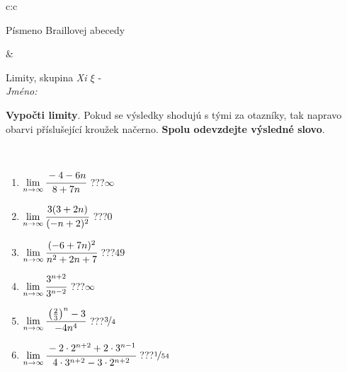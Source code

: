 \documentclass[10pt]{report}
\begin{document}
\begin{tabular}{c:c}
\begin{minipage}[c][104.5mm][t]{0.5\linewidth}
\begin{center}
\begin{minipage}{0.20\linewidth}
\begin{center}
{\small Písmeno Braillovej abecedy}
\end{center}
\end{minipage}
\end{center}
\end{minipage}
&
\begin{minipage}[c][104.5mm][t]{0.5\linewidth}
\begin{center}
\vspace{7mm}
{\huge Limity, skupina \textit{Xi $\xi$} -}\\[5mm]
\textit{Jméno:}\phantom{xxxxxxxxxxxxxxxxxxxxxxxxxxxxxxxxxxxxxxxxxxxxxxxxxxxxxxxxxxxxxxxxx}\\[5mm]
\begin{minipage}{0.95\linewidth}
\begin{center}
\textbf{Vypočti limity}. Pokud se výsledky shodujú s tými za otazníky, tak napravo\\obarvi příslušející kroužek načerno. \textbf{Spolu odevzdejte výsledné slovo}.
\end{center}
\end{minipage}
\\[1mm]
\begin{minipage}{0.79\linewidth}
\begin{center}
\begin{varwidth}{\linewidth}
\begin{enumerate}
\normalsize
\item $\lim\limits_{n\to\infty}\cfrac{-4-6n}{8+7n}$\quad \dotfill\; ???\;\dotfill \quad $\infty$
\item $\lim\limits_{n\to\infty}\cfrac{3(3+2n)}{(-n+2)^2}$\quad \dotfill\; ???\;\dotfill \quad $0$
\item $\lim\limits_{n\to\infty}\cfrac{(-6+7n)^2}{n^2+2n+7}$\quad \dotfill\; ???\;\dotfill \quad $49$
\item $\lim\limits_{n\to\infty}\cfrac{3^{n+2}}{3^{n-2}}$\quad \dotfill\; ???\;\dotfill \quad $\infty$
\item $\lim\limits_{n\to\infty}\cfrac{\left(\frac{2}{3}\right)^n -3}{-4n^{4}}$\quad \dotfill\; ???\;\dotfill \quad $\nicefrac{3}{4}$
\item $\lim\limits_{n\to\infty}\cfrac{-2\cdot 2^{n+2}+2\cdot 3^{n-1}}{4\cdot 3^{n+2}-3\cdot 2^{n+2}}$\quad \dotfill\; ???\;\dotfill \quad $\nicefrac{1}{54}$
\end{enumerate}
\end{varwidth}
\end{center}
\end{minipage}
\begin{minipage}{0.20\linewidth}

\end{minipage}
\end{center}
\end{minipage}
\end{tabular}
\end{document}
